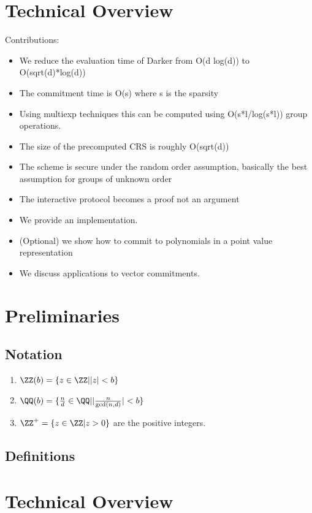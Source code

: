 \documentclass[11pt]{article}
\theoremstyle{Definition}
\begin{document}
\section{Technical Overview}
Contributions:
\begin{itemize}
	\item We reduce the evaluation time of Darker from O(d log(d)) to O(sqrt(d)*log(d))
	\item The commitment time is O(s) where s is the sparsity 
	\item Using multiexp techniques this can be computed using O(s*l/log(s*l)) group operations. 
	\item The size of the precomputed CRS is roughly O(sqrt(d))
	\item The scheme is secure under the random order assumption, basically the best assumption for groups of unknown order
	\item The interactive protocol becomes a proof not an argument
	\item We provide an implementation.
	\item (Optional) we show how to commit to polynomials in a point value representation
	\item We discuss applications to vector commitments. 
\end{itemize}

\section{Preliminaries}
\subsection{Notation}
\begin{enumerate}
	\item $\ZZ(b)=\{ z \in \ZZ | |z|<b\}$
	\item $\QQ(b)=\{\frac{n}{d} \in \QQ | |\frac{n}{\gcd(n,d)}|< b\}$
	\item $\ZZ^+=\{z \in \ZZ | z>0\}$ are the positive integers.
	\end{enumerate}
	
\subsection{Definitions}

\section{Technical Overview}
\end{document}

